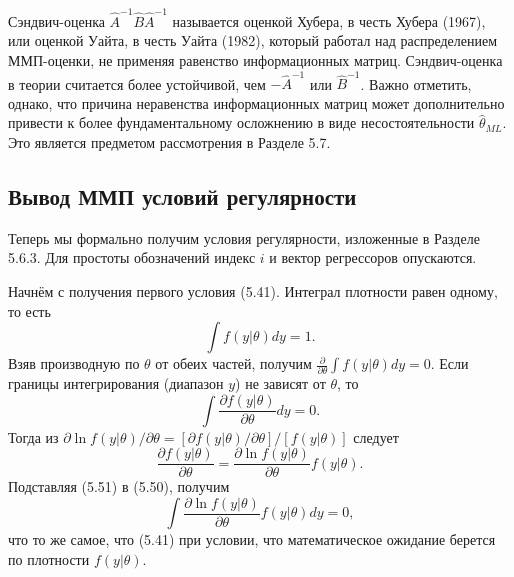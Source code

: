 Сэндвич-оценка $\hat{A}^{-1}\hat{B}\hat{A}^{-1}$ называется оценкой Хубера, в честь Хубера (1967), или оценкой Уайта, в честь Уайта (1982), который работал над распределением ММП-оценки, не применяя равенство информационных матриц. Сэндвич-оценка в теории считается
более устойчивой, чем $-\hat{A}^{-1}$ или $\hat{B}^{-1}$. Важно отметить, однако, что причина неравенства информационных матриц может дополнительно привести к более фундаментальному осложнению в виде несостоятельности $\hat{\theta}_{ML}$. Это является предметом рассмотрения в Разделе 5.7.

\subsection{Вывод ММП условий регулярности}

Теперь мы формально получим  условия регулярности, изложенные в Разделе 5.6.3. Для простоты обозначений индекс $i$ и вектор регрессоров опускаются.

Начнём с получения первого условия (5.41). Интеграл плотности равен одному, то есть
\[
\int f(y|\theta)dy=1.
\]
Взяв производную по $\theta$ от обеих частей, получим $\frac{\partial}{\partial \theta} \int f(y|\theta)dy=0$. Если границы интегрирования (диапазон $y$) не зависят от $\theta$, то
\begin{equation}
\int \frac{\partial f(y|\theta)}{\partial \theta}dy=0.
\end{equation} 
Тогда из  $\partial \ln f(y|\theta)/\partial \theta= [\partial f(y|\theta) / \partial \theta]/ [f(y|\theta)]$ следует
\begin{equation}
\frac{\partial f(y|\theta)}{\partial \theta}=\frac{\partial \ln f(y|\theta)}{\partial \theta}f(y|\theta).
\end{equation} 
Подставляя (5.51) в (5.50), получим
\begin{equation}
\int \frac{\partial \ln f(y|\theta)}{\partial \theta}f(y|\theta)dy=0,
\end{equation} 
что то же самое, что (5.41) при условии, что математическое ожидание берется по плотности $f(y|\theta)$.

